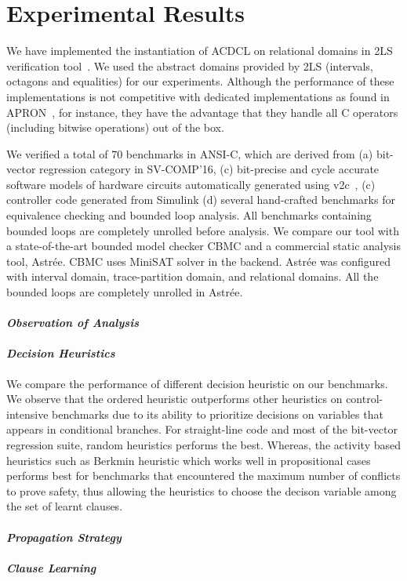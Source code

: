 \section{Experimental Results}
We have implemented the instantiation of ACDCL on relational domains
in 2LS verification tool~\cite{2ls}.  We used the abstract domains
provided by 2LS (intervals, octagons and equalities) for our
experiments. Although the performance of these implementations is not
competitive with dedicated implementations as found in
APRON~\cite{apron}, for instance, they have the advantage that they
handle all C operators (including bitwise operations) out of the box.

We verified a total of 70 benchmarks in ANSI-C, which are derived from 
(a) bit-vector regression category in SV-COMP'16, (c) bit-precise and 
cycle accurate software models of hardware circuits automatically 
generated using v2c~\cite{mtk2016}, (c) controller code generated 
from Simulink (d) several hand-crafted benchmarks for equivalence 
checking and bounded loop analysis.  All benchmarks containing 
bounded loops are completely unrolled before analysis.  We compare 
our tool with a state-of-the-art bounded model checker CBMC and a 
commercial static analysis tool, Astr{\'e}e.  CBMC uses MiniSAT 
solver in the backend.  Astr{\'e}e was configured with interval 
domain, trace-partition domain, and relational domains.  All the 
bounded loops are completely unrolled in Astr{\'e}e.   

\paragraph {\em Observation of Analysis}

\paragraph {\em \textbf{Decision Heuristics}} We compare the performance of 
different decision heuristic on our benchmarks.  We observe that 
the ordered heuristic outperforms other heuristics on control-intensive 
benchmarks due to its ability to prioritize decisions on variables that 
appears in conditional branches.  For straight-line code and most of 
the bit-vector regression suite, random heuristics performs the best.  
Whereas, the activity based heuristics such as Berkmin heuristic which 
works well in propositional cases performs best for benchmarks that 
encountered the maximum number of conflicts to prove safety, thus allowing 
the heuristics to choose the decison variable among the set of learnt clauses.   

\paragraph {\em \textbf{Propagation Strategy}}      

\paragraph {\em \textbf{Clause Learning}}      

  
